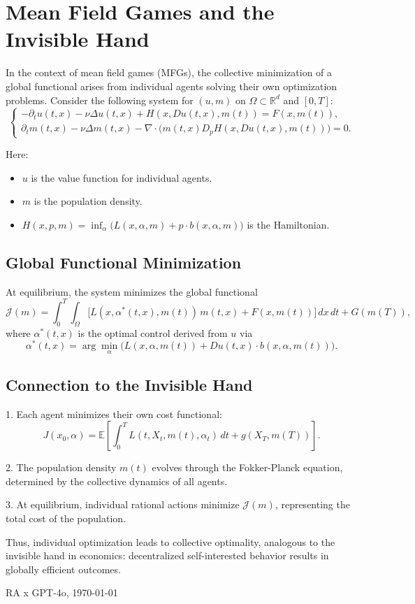 \documentclass[12pt]{article}
\newcommand{\IE}{\mathbb{E}}
\begin{document}
	
\section*{Mean Field Games and the Invisible Hand}

In the context of mean field games (MFGs), the collective minimization of a global functional arises from individual agents solving their own optimization problems. Consider the following system for $(u,m)$ on $\Omega \subset \mathbb{R}^d$ and $[0,T]$:
\[
\begin{cases}
-\partial_t u(t,x) - \nu \Delta u(t,x) + H(x,Du(t,x),m(t)) = F(x,m(t)), \\[6pt]
\partial_t m(t,x) - \nu \Delta m(t,x) - \nabla \cdot \bigl(m(t,x)D_pH(x,Du(t,x),m(t))\bigr) = 0.
\end{cases}
\]

Here:
\begin{itemize}
\item $u$ is the value function for individual agents.
\item $m$ is the population density.
\item $H(x,p,m) = \inf_\alpha \bigl( L(x,\alpha,m) + p \cdot b(x,\alpha,m) \bigr)$ is the Hamiltonian.
\end{itemize}

\subsection*{Global Functional Minimization}

At equilibrium, the system minimizes the global functional
\[
\mathcal{J}(m) = \int_0^T \int_{\Omega} \bigl[L(x,\alpha^*(t,x),m(t))\,m(t,x) + F(x,m(t))\bigr]\,dx\,dt + G(m(T)),
\]
where $\alpha^*(t,x)$ is the optimal control derived from $u$ via
\[
\alpha^*(t,x) = \arg\min_\alpha \bigl( L(x,\alpha,m(t)) + Du(t,x) \cdot b(x,\alpha,m(t)) \bigr).
\]

\subsection*{Connection to the Invisible Hand}

1. Each agent minimizes their own cost functional:
   \[
   J(x_0, \alpha) = \IE \left[ \int_0^T L(t,X_t,m(t),\alpha_t) \, dt + g(X_T, m(T)) \right].
   \]
   
2. The population density $m(t)$ evolves through the Fokker-Planck equation, determined by the collective dynamics of all agents.

3. At equilibrium, individual rational actions minimize $\mathcal{J}(m)$, representing the total cost of the population.

Thus, individual optimization leads to collective optimality, analogous to the invisible hand in economics: decentralized self-interested behavior results in globally efficient outcomes.

\vfill
\hfill
RA x GPT-4o, \today
\end{document}
